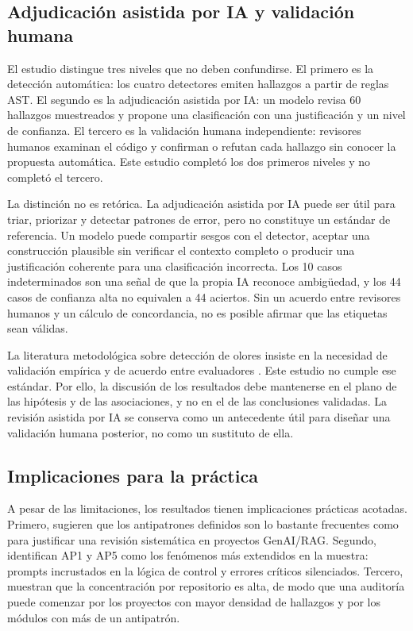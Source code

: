 \subsection{Adjudicación asistida por IA y validación humana}

El estudio distingue tres niveles que no deben confundirse. El primero es la detección automática: los cuatro detectores emiten hallazgos a partir de reglas AST. El segundo es la adjudicación asistida por IA: un modelo revisa 60 hallazgos muestreados y propone una clasificación con una justificación y un nivel de confianza. El tercero es la validación humana independiente: revisores humanos examinan el código y confirman o refutan cada hallazgo sin conocer la propuesta automática. Este estudio completó los dos primeros niveles y no completó el tercero.

La distinción no es retórica. La adjudicación asistida por IA puede ser útil para triar, priorizar y detectar patrones de error, pero no constituye un estándar de referencia. Un modelo puede compartir sesgos con el detector, aceptar una construcción plausible sin verificar el contexto completo o producir una justificación coherente para una clasificación incorrecta. Los 10 casos indeterminados son una señal de que la propia IA reconoce ambigüedad, y los 44 casos de confianza alta no equivalen a 44 aciertos. Sin un acuerdo entre revisores humanos y un cálculo de concordancia, no es posible afirmar que las etiquetas sean válidas.

La literatura metodológica sobre detección de olores insiste en la necesidad de validación empírica y de acuerdo entre evaluadores \cite{martini_identifying_2018,mumtaz_systematic_2021}. Este estudio no cumple ese estándar. Por ello, la discusión de los resultados debe mantenerse en el plano de las hipótesis y de las asociaciones, y no en el de las conclusiones validadas. La revisión asistida por IA se conserva como un antecedente útil para diseñar una validación humana posterior, no como un sustituto de ella.

\subsection{Implicaciones para la práctica}

A pesar de las limitaciones, los resultados tienen implicaciones prácticas acotadas. Primero, sugieren que los antipatrones definidos son lo bastante frecuentes como para justificar una revisión sistemática en proyectos GenAI/RAG. Segundo, identifican AP1 y AP5 como los fenómenos más extendidos en la muestra: prompts incrustados en la lógica de control y errores críticos silenciados. Tercero, muestran que la concentración por repositorio es alta, de modo que una auditoría puede comenzar por los proyectos con mayor densidad de hallazgos y por los módulos con más de un antipatrón.

